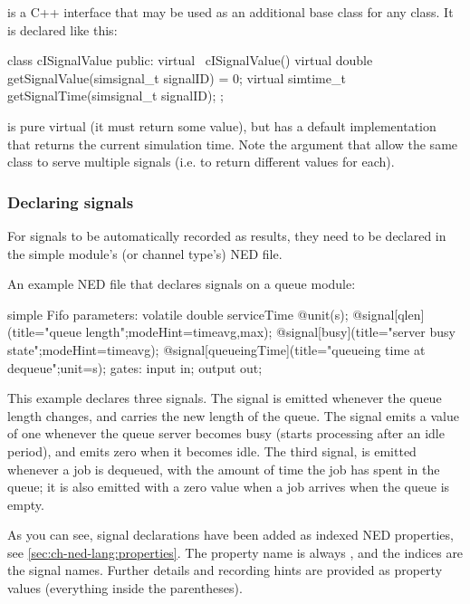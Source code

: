  is a C++ interface that may be used as an additional
base class for any class. It is declared like this:

\begin{cpp}
class cISignalValue {
    public:
        virtual ~cISignalValue() {}
        virtual double getSignalValue(simsignal_t signalID) = 0;
        virtual simtime_t getSignalTime(simsignal_t signalID);
};
\end{cpp}

 is pure virtual (it must return some value),
but  has a default implementation that
returns the current simulation time. Note the  argument
that allow the same class to serve multiple signals (i.e. to return
different values for each).


\subsubsection{Declaring signals}

For signals to be automatically recorded as results, they need to be
declared in the simple module's (or channel type's) NED file.

An example NED file that declares signals on a queue module:

\begin{ned}
simple Fifo
{
    parameters:
        volatile double serviceTime @unit(s);
        @signal[qlen](title="queue length";modeHint=timeavg,max);
        @signal[busy](title="server busy state";modeHint=timeavg);
        @signal[queueingTime](title="queueing time at dequeue";unit=s);
    gates:
        input in;
        output out;
}
\end{ned}

This example declares three signals. The  signal is emitted
whenever the queue length changes, and carries the new length of the queue.
The  signal emits a value of one whenever the queue server
becomes busy (starts processing after an idle period), and emits zero when
it becomes idle. The third signal,  is emitted whenever a
job is dequeued, with the amount of time the job has spent in the queue; it
is also emitted with a zero value when a job arrives when the queue is
empty.

As you can see, signal declarations have been added as indexed NED
properties, see \ref{sec:ch-ned-lang:properties}. The property name is
always , and the indices are the signal names. Further details
and recording hints are provided as property values (everything inside the
parentheses).

